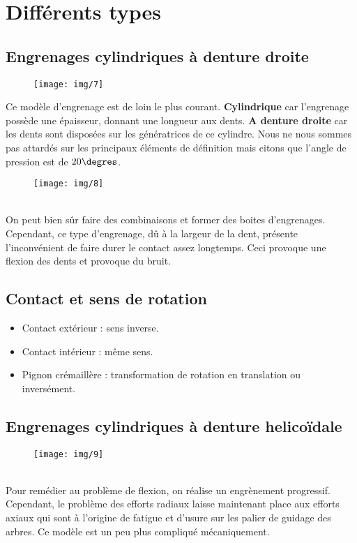\section{Différents types}
\subsection{Engrenages cylindriques à denture droite}
	\begin{wrapfigure}[5]{l}{2.5cm}
	\texttt{[image: img/7]}
	\end{wrapfigure}	
	\noindent Ce modèle d'engrenage est de loin le plus courant. \textbf{Cylindrique} car l'engrenage possède une épaisseur, donnant une longueur aux dents. \textbf{A denture droite} car les dents sont disposées sur les génératrices de ce cylindre. Nous ne nous sommes pas attardés sur les principaux éléments de définition mais citons que l'angle de pression est de $20\degres$.
	
	\begin{wrapfigure}[5]{r}{2.5cm}
	\texttt{[image: img/8]}
	\end{wrapfigure}	
	\ \\ On peut bien sûr faire des combinaisons et former des boites d'engrenages. Cependant, ce type d'engrenage, dû à la largeur de la dent, présente l'inconvénient de faire durer le contact assez longtemps. Ceci provoque une flexion des dents et provoque du bruit.
	
\subsection{Contact et sens de rotation}
	\begin{itemize}
	\item Contact extérieur : sens inverse.
	\item Contact intérieur : même sens.
	\item Pignon crémaillère : transformation de rotation en translation ou inversément. 
	\end{itemize}
	
\subsection{Engrenages cylindriques à denture helicoïdale}
	\begin{wrapfigure}[5]{l}{2cm}
	\texttt{[image: img/9]}
	\end{wrapfigure}	
	\ \\ Pour remédier au problème de flexion, on réalise un engrènement progressif. Cependant, le problème des efforts radiaux laisse maintenant place aux efforts axiaux qui sont à l'origine de fatigue et d'usure sur les palier de guidage des arbres. Ce modèle est un peu plus compliqué mécaniquement. \\
	
